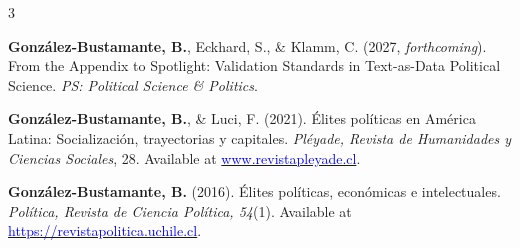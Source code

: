 \begin{publications}

\begin{benumerate}{3}

\item{{\bfseries González-Bustamante, B.}, Eckhard, S., \& Klamm, C. (2027, {\itshape forthcoming}). From the Appendix to Spotlight: Validation Standards in Text-as-Data Political Science. {\itshape PS: Political Science \& Politics}.}




\item{{\bfseries González-Bustamante, B.}, \& Luci, F. (2021). Élites políticas en América Latina: Socialización, trayectorias y capitales. {\itshape Pléyade, Revista de Humanidades y Ciencias Sociales}, 28. Available at \href{http://www.revistapleyade.cl/index.php/OJS/issue/view/30}{\textcolor{blue}{www.revistapleyade.cl}}.}\vspace{1mm}


\item{{\bfseries González-Bustamante, B.} (2016). Élites políticas, económicas e intelectuales. {\itshape Política, Revista de Ciencia Política, 54}(1). Available at \href{https://revistapolitica.uchile.cl/index.php/RP/issue/view/4365}{\textcolor{blue}{https://revistapolitica.uchile.cl}}.}\vspace{1mm}

\end{benumerate}

\end{publications}
\pagebreak